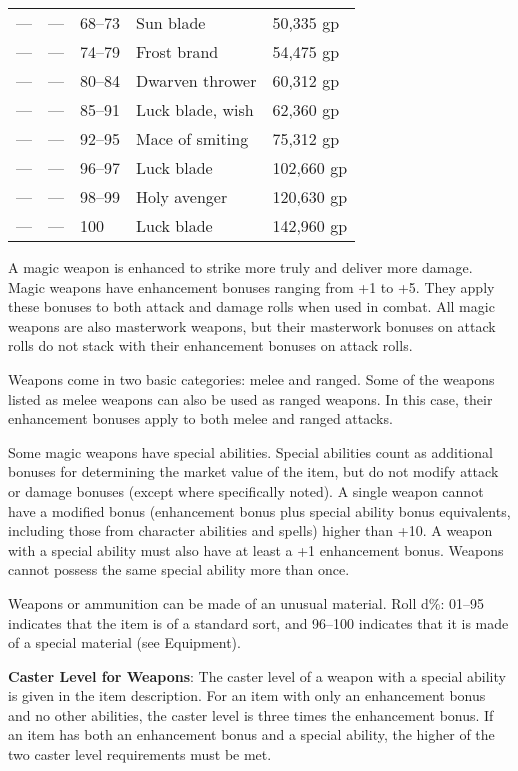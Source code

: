 \begin{table}[]
\begin{tabular}{lllll}
— & — & 68–73 & Sun blade & 50,335 gp\\
— & — & 74–79 & Frost brand & 54,475 gp\\
— & — & 80–84 & Dwarven thrower & 60,312 gp\\
— & — & 85–91 & Luck blade, wish & 62,360 gp\\
— & — & 92–95 & Mace of smiting & 75,312 gp\\
— & — & 96–97 & Luck blade & 102,660 gp\\
— & — & 98–99 & Holy avenger & 120,630 gp\\
— & — & 100 & Luck blade & 142,960 gp\\
\end{tabular}
\end{table}
								
A magic weapon is enhanced to strike more truly and deliver more damage. Magic weapons have enhancement bonuses ranging from +1 to +5. They apply these bonuses to both attack and damage rolls when used in combat. All magic weapons are also masterwork weapons, but their masterwork bonuses on attack rolls do not stack with their enhancement bonuses on attack rolls.
				
Weapons come in two basic categories: melee and ranged. Some of the weapons listed as melee weapons can also be used as ranged weapons. In this case, their enhancement bonuses apply to both melee and ranged attacks.
				
Some magic weapons have special abilities. Special abilities count as additional bonuses for determining the market value of the item, but do not modify attack or damage bonuses (except where specifically noted). A single weapon cannot have a modified bonus (enhancement bonus plus special ability bonus equivalents, including those from character abilities and spells) higher than +10. A weapon with a special ability must also have at least a +1 enhancement bonus. Weapons cannot possess the same special ability more than once.
				
Weapons or ammunition can be made of an unusual material. Roll d\%: 01--95 indicates that the item is of a standard sort, and 96--100 indicates that it is made of a special material (see Equipment).
				
\textbf{Caster Level for Weapons}: The caster level of a weapon with a special ability is given in the item description. For an item with only an enhancement bonus and no other abilities, the caster level is three times the enhancement bonus. If an item has both an enhancement bonus and a special ability, the higher of the two caster level requirements must be met.
				
